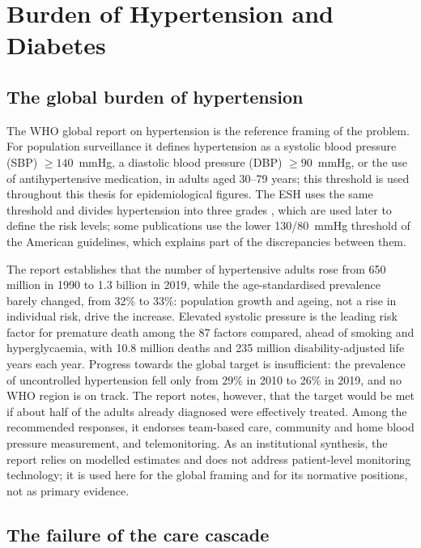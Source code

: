 \documentclass[11pt,a4paper,oneside]{report}
\begin{document}
\section{Burden of Hypertension and Diabetes}\label{sec:burden}\label{sec:hta-burden}

\subsection{The global burden of hypertension}

The WHO global report on hypertension \parencite{who2023hypertension} is the reference framing of the problem. For population surveillance it defines hypertension as a systolic blood pressure (SBP) $\geq 140$~mmHg, a diastolic blood pressure (DBP) $\geq 90$~mmHg, or the use of antihypertensive medication, in adults aged 30--79 years; this threshold is used throughout this thesis for epidemiological figures. The ESH uses the same threshold and divides hypertension into three grades \parencite{mancia2023}, which are used later to define the risk levels; some publications use the lower 130/80~mmHg threshold of the American guidelines, which explains part of the discrepancies between them.

The report establishes that the number of hypertensive adults rose from 650 million in 1990 to 1.3 billion in 2019, while the age-standardised prevalence barely changed, from 32\% to 33\%: population growth and ageing, not a rise in individual risk, drive the increase. Elevated systolic pressure is the leading risk factor for premature death among the 87 factors compared, ahead of smoking and hyperglycaemia, with 10.8 million deaths and 235 million disability-adjusted life years each year. Progress towards the global target is insufficient: the prevalence of uncontrolled hypertension fell only from 29\% in 2010 to 26\% in 2019, and no WHO region is on track. The report notes, however, that the target would be met if about half of the adults already diagnosed were effectively treated. Among the recommended responses, it endorses team-based care, community and home blood pressure measurement, and telemonitoring. As an institutional synthesis, the report relies on modelled estimates and does not address patient-level monitoring technology; it is used here for the global framing and for its normative positions, not as primary evidence.

\subsection{The failure of the care cascade}\label{sec:cascade}
\end{document}

